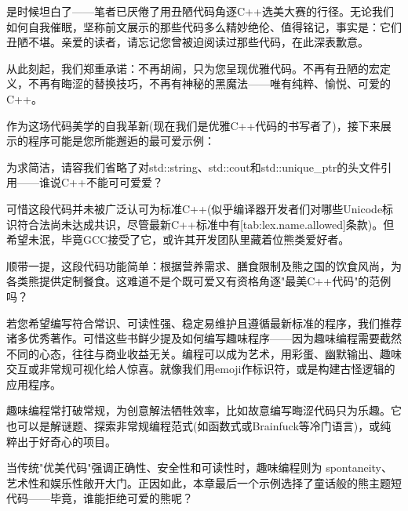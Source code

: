 
是时候坦白了——笔者已厌倦了用丑陋代码角逐C++选美大赛的行径。无论我们如何自我催眠，坚称前文展示的那些代码多么精妙绝伦、值得铭记，事实是：它们丑陋不堪。亲爱的读者，请忘记您曾被迫阅读过那些代码，在此深表歉意。

从此刻起，我们郑重承诺：不再胡闹，只为您呈现优雅代码。不再有丑陋的宏定义，不再有晦涩的替换技巧，不再有神秘的黑魔法——唯有纯粹、愉悦、可爱的C++。

作为这场代码美学的自我革新(现在我们是优雅C++代码的书写者了)，接下来展示的程序可能是您所能邂逅的最可爱示例：


为求简洁，请容我们省略了对std::string、std::cout和std::unique\_ptr的头文件引用——谁说C++不能可可爱爱？

可惜这段代码并未被广泛认可为标准C++(似乎编译器开发者们对哪些Unicode标识符合法尚未达成共识，尽管最新C++标准中有[tab:lex.name.allowed]条款)。但希望未泯，毕竟GCC接受了它，或许其开发团队里藏着位熊类爱好者。

顺带一提，这段代码功能简单：根据营养需求、膳食限制及熊之国的饮食风尚，为各类熊提供定制餐食。这难道不是个既可爱又有资格角逐"最美C++代码"的范例吗？

若您希望编写符合常识、可读性强、稳定易维护且遵循最新标准的程序，我们推荐诸多优秀著作。可惜这些书鲜少提及如何编写趣味程序——因为趣味编程需要截然不同的心态，往往与商业收益无关。编程可以成为艺术，用彩蛋、幽默输出、趣味交互或非常规可视化给人惊喜。就像我们用emoji作标识符，或是构建古怪逻辑的应用程序。

趣味编程常打破常规，为创意解法牺牲效率，比如故意编写晦涩代码只为乐趣。它也可以是解谜题、探索非常规编程范式(如函数式或Brainfuck等冷门语言)，或纯粹出于好奇心的项目。

当传统"优美代码"强调正确性、安全性和可读性时，趣味编程则为 spontaneity、艺术性和娱乐性敞开大门。正因如此，本章最后一个示例选择了童话般的熊主题短代码——毕竟，谁能拒绝可爱的熊呢？